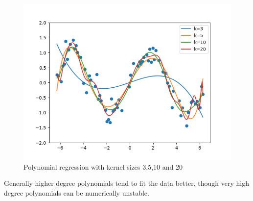 \begin{answer}
\begin{figure}[H]
  \centering
  \vspace{-2mm}
  \includegraphics[width=0.65\linewidth]{../src/featuremaps/large-poly.png}
  \centering
\caption{Polynomial regression with kernel sizes 3,5,10 and 20}
\end{figure}

Generally higher degree polynomials tend to fit the data better, though very high degree polynomials can be numerically unstable.

\end{answer}
